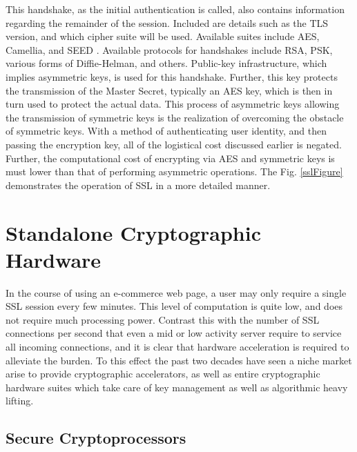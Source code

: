 \documentclass[journal]{IEEEtran}
\begin{document}
This handshake, as the initial authentication is called, also contains information regarding the remainder of the session.  Included are details such as the TLS version, and which cipher suite will be used.  Available suites include AES, Camellia, and SEED \cite{tlsRFC}.  Available protocols for handshakes include RSA, PSK, various forms of Diffie-Helman, and others. Public-key infrastructure, which implies asymmetric keys, is used for this handshake.  Further, this key protects the transmission of the Master Secret, typically an AES key, which is then in turn used to protect the actual data.  This process of asymmetric keys allowing the transmission of symmetric keys is the realization of overcoming the obstacle of symmetric keys.  With a method of authenticating user identity, and then passing the encryption key, all of the logistical cost discussed earlier is negated.  Further, the computational cost of encrypting via AES and symmetric keys is must lower than that of performing asymmetric operations.  The Fig. \ref{sslFigure} demonstrates the operation of SSL in a more detailed manner.

\section{Standalone Cryptographic Hardware}

In the course of using an e-commerce web page, a user may only require a single SSL session every few minutes.  This level of computation is quite low, and does not require much processing power.  Contrast this with the number of SSL connections per second that even a mid or low activity server require to service all incoming connections, and it is clear that hardware acceleration is required to alleviate the burden.  To this effect the past two decades have seen a niche market arise to provide cryptographic accelerators, as well as entire cryptographic hardware suites which take care of key management as well as algorithmic heavy lifting.

\subsection{Secure Cryptoprocessors}
\end{document}
